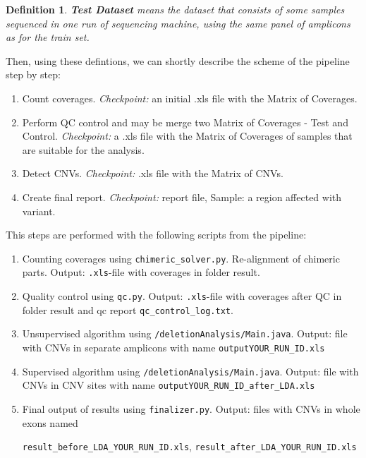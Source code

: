 \documentclass{article}
\newtheorem{mydef}{Definition}
\begin{document}
\begin{mydef}
 {\bf Test Dataset} means the dataset that consists of some samples sequenced in one run of sequencing machine, using the same panel of amplicons as for the train set.
\end{mydef}

Then, using these defintions, we can shortly describe the scheme of the pipeline step by step:

\begin{enumerate}
\item Count coverages. {\it Checkpoint:} an initial .xls file with the Matrix of Coverages.

\item Perform QC control and may be merge two Matrix of Coverages - Test and Control. {\it Checkpoint:} a .xls file with the Matrix of Coverages of samples that are suitable for the analysis.

\item Detect CNVs. {\it Checkpoint:} .xls file with the Matrix of CNVs.

\item Create final report. {\it Checkpoint:} report file, Sample: a region affected with variant.

\end{enumerate}



This steps are performed with the following scripts from the pipeline:

\begin{enumerate}
\item Counting coverages using \texttt{chimeric\_solver.py}. Re-alignment of chimeric parts.
     Output: \texttt{.xls}-file with coverages in folder result.
\item Quality control using \texttt{qc.py}.
     Output: \texttt{.xls}-file with coverages after QC in folder result and qc report \texttt{qc\_control\_log.txt}.
\item Unsupervised algorithm using \texttt{/deletionAnalysis/Main.java}.
     Output: file with CNVs in separate amplicons with name
         \texttt{outputYOUR\_RUN\_ID.xls}
\item Supervised algorithm using \texttt{/deletionAnalysis/Main.java}.
     Output: file with CNVs in CNV sites  with name
         \texttt{outputYOUR\_RUN\_ID\_after\_LDA.xls}
\item Final output of results using \texttt{finalizer.py}.
      Output: files with CNVs in whole exons named
      
      \texttt{result\_before\_LDA\_YOUR\_RUN\_ID.xls}, 
      \texttt{result\_after\_LDA\_YOUR\_RUN\_ID.xls}
\end{enumerate}
\end{document}
